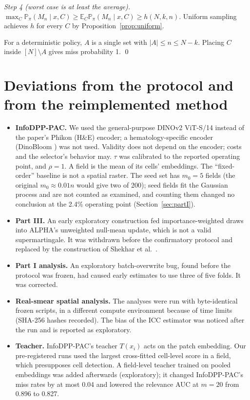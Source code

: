 \documentclass[11pt]{article}
\theoremstyle{remark}
\theoremstyle{definition}
\newcommand{\Prb}{\mathbb{P}}
\newcommand{\E}{\mathbb{E}}
\begin{document}
\emph{Step 4 (worst case is at least the average).} $\max_C\Prb_\pi(M_n\mid x,C)\ge\E_C\Prb_\pi(M_n\mid x,C)\ge h(N,k,n)$. Uniform sampling achieves $h$ for every $C$ by Proposition~\ref{prop:uniform}.

For a deterministic policy, $A$ is a single set with $|A|\le n\le N-k$. Placing $C$ inside $[N]\setminus A$ gives miss probability 1. \qed

\section{Deviations from the protocol and from the reimplemented method}\label{app:dev}
\begin{itemize}
\item \textbf{InfoDPP-PAC.} We used the general-purpose DINOv2 ViT-S/14 instead of the paper's Phikon (H\&E) encoder; a hematology-specific encoder (DinoBloom \cite{koch2024dinobloom}) was not used. Validity does not depend on the encoder; costs and the selector's behavior may. $\tau$ was calibrated to the reported operating point, and $\rho=1$. A field is the mean of its cells' embeddings. The ``fixed-order'' baseline is not a spatial raster. The seed set has $m_0=5$ fields (the original $m_0\approx0.01n$ would give two of 200); seed fields fit the Gaussian process and are not counted as examined, and counting them changed no conclusion at the 2.4\% operating point (Section~\ref{sec:partI}).
\item \textbf{Part III.} An early exploratory construction fed importance-weighted draws into ALPHA's unweighted null-mean update, which is not a valid supermartingale. It was withdrawn before the confirmatory protocol and replaced by the construction of Shekhar et al.\ \cite{shekhar2023rlfa}.
\item \textbf{Part I analysis.} An exploratory batch-overwrite bug, found before the protocol was frozen, had caused early estimates to use three of five folds. It was corrected.
\item \textbf{Real-smear spatial analysis.} The analyses were run with byte-identical frozen scripts, in a different compute environment because of time limits (SHA-256 hashes recorded). The bias of the ICC estimator was noticed after the run and is reported as exploratory.
\item \textbf{Teacher.} InfoDPP-PAC's teacher $T(x_i)$ acts on the patch embedding. Our pre-registered runs used the largest cross-fitted cell-level score in a field, which presupposes cell detection. A field-level teacher trained on pooled embeddings was added afterwards (exploratory); it changed InfoDPP-PAC's miss rates by at most 0.04 and lowered the relevance AUC at $m=20$ from 0.896 to 0.827.

\end{itemize}
\end{document}

